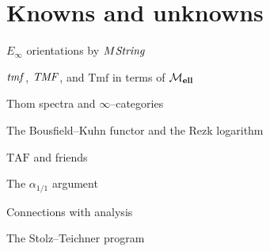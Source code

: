 
\chapter{Knowns and unknowns}


$E_\infty$ orientations by $M\mathit{String}$

$\mathit{tmf}$, $\mathit{TMF}$, and $\mathrm{Tmf}$ in terms of $\mathcal{M}_{\mathbf{ell}}$

Thom spectra and $\infty$--categories

The Bousfield--Kuhn functor and the Rezk logarithm


$\mathrm{TAF}$ and friends

The $\alpha_{1/1}$ argument




Connections with analysis

The Stolz--Teichner program

